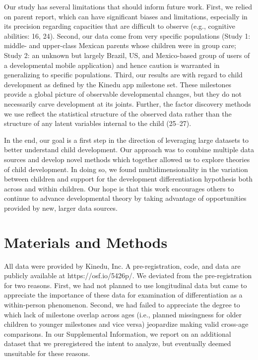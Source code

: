 \documentclass[man]{apa7}
\begin{document}
Our study has several limitations that should inform future work. First,
we relied on parent report, which can have signiﬁcant biases and
limitations, especially in its precision regarding capacities that are
difﬁcult to observe (e.g., cognitive abilities: 16, 24). Second, our
data come from very speciﬁc populations (Study 1: middle- and
upper-class Mexican parents whose children were in group care; Study 2:
an unknown but largely Brazil, US, and Mexico-based group of users of a developmental mobile application) and hence
caution is warranted in generalizing to specific populations. Third, our results are with regard to child development
as deﬁned by the Kinedu app milestone set. These milestones provide a global picture of observable developmental changes, but they do not necessarily carve development at its joints. Further, the factor discovery methods we use reflect the statistical structure of the observed data rather than the structure of any latent variables internal to the child (25--27).

In the end, our goal is a first step in the direction of leveraging
large datasets to better understand child development. Our approach was
to combine multiple data sources and develop novel methods which
together allowed us to explore theories of child development. In doing
so, we found multidimensionality in the variation between children and support for the
development differentiation hypothesis both across and within children. Our hope is
that this work encourages others to continue to advance developmental
theory by taking advantage of opportunities provided by new, 
larger data sources.

\hypertarget{mat}{%
\section{Materials and Methods}\label{mat}}
All data were provided by Kinedu, Inc. A pre-registration, code, and data are publicly available at https://osf.io/5426p/. We deviated from the pre-registration for two reasons. First, we had not planned to use longitudinal data but came to appreciate the importance of these data for examination of differentiation as a within-person phenomenon. Second,
we had failed to appreciate the degree to which lack of milestone
overlap across ages (i.e., planned missingness for older children to
younger milestones and vice versa) jeopardize making valid cross-age
comparisons. In our Supplemental Information, we report on an additional dataset that we preregistered the intent to analyze, but eventually deemed unsuitable for these reasons. 
\end{document}
